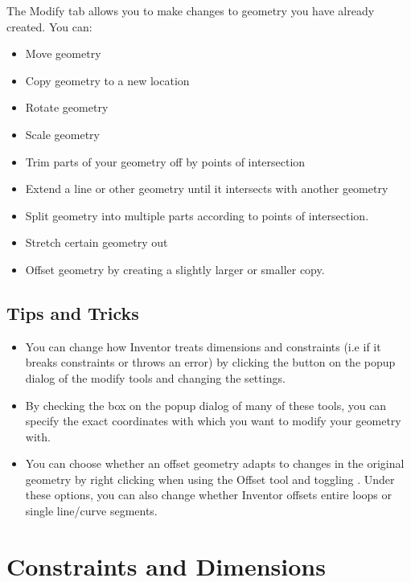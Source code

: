 \cbstart
{}
The Modify tab allows you to make changes to geometry you have already created. You can:

\begin{itemize}
\item Move geometry
\item Copy geometry to a new location
\item Rotate geometry
\item Scale geometry
\item Trim parts of your geometry off by points of intersection
\item Extend a line or other geometry until it intersects with another geometry
\item Split geometry into multiple parts according to points of intersection.
\item Stretch certain geometry out
\item Offset geometry by creating a slightly larger or smaller copy.
\end{itemize}
\cbend

\subsection{Tips and Tricks}
\cbstart
{}
\begin{itemize}
\item You can change how Inventor treats dimensions and constraints (i.e if it breaks constraints or throws an error) by clicking the \appcommand{\textgreater \textgreater} button on the popup dialog of the modify tools and changing the settings.
\item By checking the  box on the popup dialog of many of these tools, you can specify the exact coordinates with which you want to modify your geometry with.
\item You can choose whether an offset geometry adapts to changes in the original geometry by right clicking when using the Offset tool and toggling . Under these options, you can also change whether Inventor offsets entire loops or single line/curve segments.
\end{itemize}
\cbend

\section{Constraints and Dimensions}
\label{chap:constraints}


